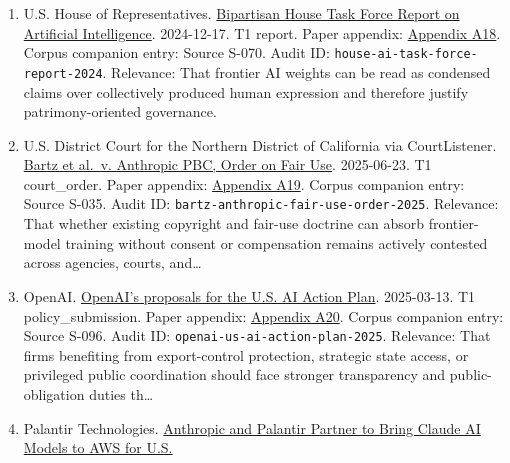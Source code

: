 \documentclass[
  american,
  11pt,
  letterpaper,
]{article}
\begin{document}
\begin{enumerate}
{  A17}. Corpus companion entry: Source S-122. Audit ID:
  \texttt{twinchat-ai-copyright-weights}. Relevance: That frontier AI
  weights can be read as condensed claims over collectively produced
  human expression and therefore justify patrimony-oriented governance.
\item
  U.S. House of Representatives.
  \href{https://www.speaker.gov/wp-content/uploads/2024/12/AI-Task-Force-Report-FINAL.pdf}{Bipartisan
  House Task Force Report on Artificial Intelligence}. 2024-12-17. T1
  report. Paper appendix:
  \hyperref[ch-10-appendix-a18-bipartisan-house-task-force-report-on-artificial-intelligence]{Appendix
  A18}. Corpus companion entry: Source S-070. Audit ID:
  \texttt{house-ai-task-force-report-2024}. Relevance: That frontier AI
  weights can be read as condensed claims over collectively produced
  human expression and therefore justify patrimony-oriented governance.
\item
  U.S. District Court for the Northern District of California via
  CourtListener.
  \href{https://storage.courtlistener.com/recap/gov.uscourts.cand.434709/gov.uscourts.cand.434709.231.0_3.pdf}{Bartz
  et al.~v. Anthropic PBC, Order on Fair Use}. 2025-06-23. T1
  court\_order. Paper appendix:
  \hyperref[ch-10-appendix-a19-bartz-et-al-v-anthropic-pbc-order-on-fair-use]{Appendix
  A19}. Corpus companion entry: Source S-035. Audit ID:
  \texttt{bartz-anthropic-fair-use-order-2025}. Relevance: That whether
  existing copyright and fair-use doctrine can absorb frontier-model
  training without consent or compensation remains actively contested
  across agencies, courts, and\ldots{}
\item
  OpenAI.
  \href{https://openai.com/global-affairs/openai-proposals-for-the-us-ai-action-plan/}{OpenAI's
  proposals for the U.S. AI Action Plan}. 2025-03-13. T1
  policy\_submission. Paper appendix:
  \hyperref[ch-10-appendix-a20-openais-proposals-for-the-us-ai-action-plan]{Appendix
  A20}. Corpus companion entry: Source S-096. Audit ID:
  \texttt{openai-us-ai-action-plan-2025}. Relevance: That firms
  benefiting from export-control protection, strategic state access, or
  privileged public coordination should face stronger transparency and
  public-obligation duties th\ldots{}
\item
  Palantir Technologies.
  \href{https://investors.palantir.com/news-details/2024/Anthropic-and-Palantir-Partner-to-Bring-Claude-AI-Models-to-AWS-for-U.S.-Government-Intelligence-and-Defense-Operations/}{Anthropic
  and Palantir Partner to Bring Claude AI Models to AWS for U.S.
}
\end{enumerate}
\end{document}
